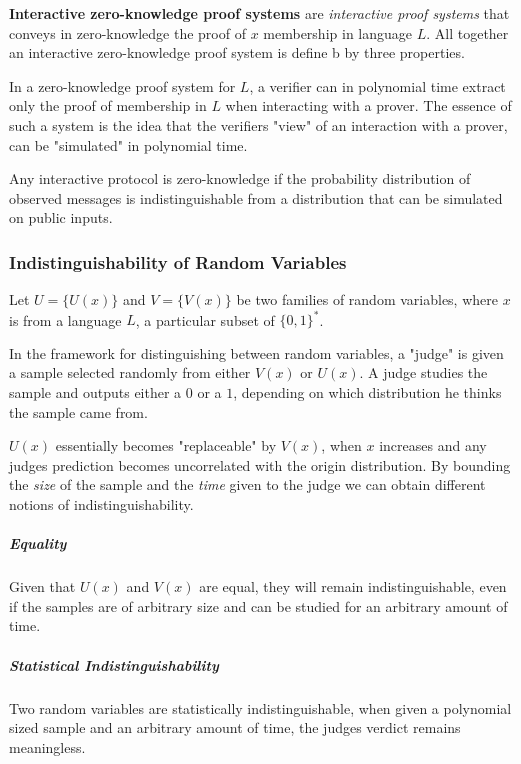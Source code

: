 \textbf{Interactive zero-knowledge proof systems} are  \textit{interactive proof systems} that conveys in zero-knowledge the proof of $x$ membership in language $L$. All together an interactive zero-knowledge proof system is define b by three properties.

\bigskip

In a zero-knowledge proof system for $L$, a verifier can in polynomial time extract only the proof of membership in $L$ when interacting with a prover. The essence of such a system is the idea that the verifiers "view" of an interaction with a prover, can be "simulated" in polynomial time.


Any interactive protocol is zero-knowledge if the probability distribution of observed messages is indistinguishable from a distribution that can be simulated on public inputs.

\subsubsection{Indistinguishability of Random Variables}

Let $U = \{U(x)\}$ and $V = \{V(x)\}$ be two families of random variables, where $x$ is from a language $L$, a particular subset of $\{0, 1\}^*$.

In the framework for distinguishing between random variables, a "judge" is given a sample selected randomly from either $V(x)$ or $U(x)$.
A judge studies the sample and outputs either a $0$ or a $1$, depending on which distribution he thinks the sample came from.

$U(x)$ essentially becomes "replaceable" by $V(x)$, when $x$ increases and any judges prediction becomes uncorrelated with the origin distribution.
By bounding the \textit{size} of the sample and the \textit{time} given to the judge we can obtain different notions of indistinguishability.

\subparagraph{Equality} Given that $U(x)$ and $V(x)$ are equal, they will remain indistinguishable, even if the samples are of arbitrary size and can be studied for an arbitrary amount of time.

\subparagraph{Statistical Indistinguishability} Two random variables are statistically indistinguishable, when given a polynomial sized sample and an arbitrary amount of time, the judges verdict remains meaningless.

\bigskip

